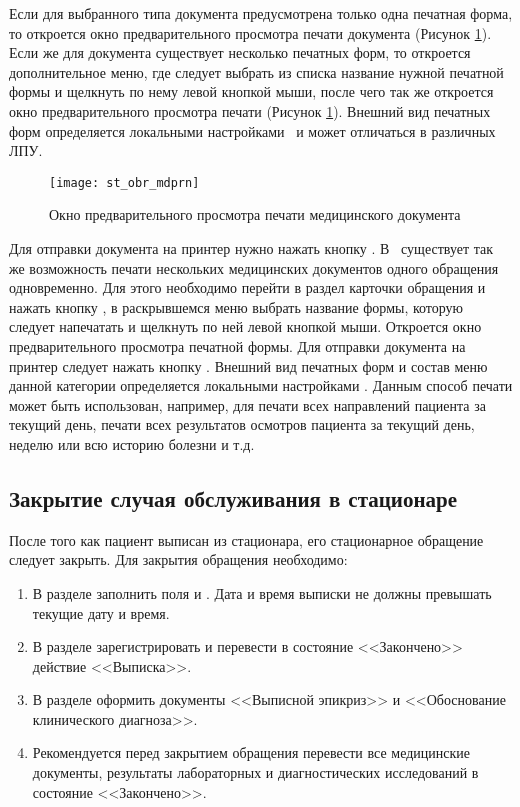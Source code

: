 Если для выбранного типа документа предусмотрена только одна печатная форма, то откроется окно предварительного просмотра печати документа (Рисунок \ref{img_st_obr_mdprn}). Если же для документа существует несколько печатных форм, то откроется дополнительное меню, где следует выбрать из списка название нужной печатной формы и щелкнуть по нему левой кнопкой мыши, после чего так же откроется окно предварительного просмотра печати (Рисунок \ref{img_st_obr_mdprn}). Внешний вид печатных форм определяется локальными настройками \tmis~и может отличаться в различных ЛПУ.

\begin{figure}[ht]\centering
   \texttt{[image: st\_obr\_mdprn]}
   \caption{Окно предварительного просмотра печати медицинского документа}
   \label{img_st_obr_mdprn}
\end{figure} 

Для отправки документа на принтер нужно нажать кнопку  .
В \tmis~существует так же возможность печати нескольких медицинских документов одного обращения одновременно. Для этого необходимо перейти в раздел  карточки обращения и нажать кнопку , в раскрывшемся меню выбрать название формы, которую следует напечатать и щелкнуть по ней левой кнопкой мыши. Откроется окно предварительного просмотра печатной формы. Для отправки документа на принтер следует нажать кнопку . Внешний вид печатных форм и состав меню данной категории определяется локальными настройками \tmis. Данным способ печати может быть использован, например, для печати всех направлений пациента за текущий день, печати всех результатов осмотров пациента за текущий день, неделю или всю историю болезни и т.д.

\subsection{Закрытие случая обслуживания в стационаре} \label{st_obr_close}

После того как пациент выписан из стационара, его стационарное обращение следует закрыть. Для закрытия обращения необходимо:
\begin{enumerate}
 \item В разделе  заполнить поля  и . Дата и время выписки не должны превышать текущие дату и время.
 \item В разделе  зарегистрировать и перевести в состояние <<Закончено>> действие <<Выписка>>.
 \item В разделе  оформить документы <<Выписной эпикриз>> и <<Обоснование клинического диагноза>>.
 \item Рекомендуется перед закрытием обращения перевести все медицинские документы, результаты лабораторных и диагностических исследований в состояние <<Закончено>>.
\end{enumerate}

